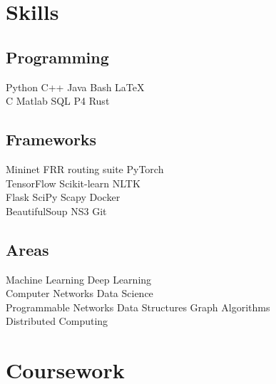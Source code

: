 \documentclass[]{onepage}
\begin{document}
\begin{minipage}[t]{0.33\textwidth}

\section{Skills}
\subsection{Programming}
\textbullet{} Python \textbullet{} C++ \textbullet{} Java \textbullet{} Bash \textbullet{} \LaTeX\  \\ 
\textbullet{} C \textbullet{} Matlab \textbullet{} SQL \textbullet{} P4 \textbullet{} Rust \\ 
\vspace{0.1cm}
\subsection{Frameworks}
\textbullet{} Mininet \textbullet{} FRR routing suite \textbullet{} PyTorch \\ \textbullet{} TensorFlow \textbullet{}Scikit-learn \textbullet{} NLTK \\ \textbullet{} Flask \textbullet{} SciPy \textbullet{} Scapy \textbullet{} Docker\\ \textbullet{} BeautifulSoup \textbullet{} NS3 \textbullet{} Git
\vspace{0.1cm}
\subsection{Areas}
\textbullet{} Machine Learning \textbullet{} Deep Learning \\ \textbullet{} Computer Networks \textbullet{} Data Science \\ \textbullet{} Programmable Networks \textbullet{} Data Structures \textbullet{} Graph Algorithms\\ \textbullet{} Distributed Computing \\ 


\section{Coursework}

\end{minipage}
\end{document}
